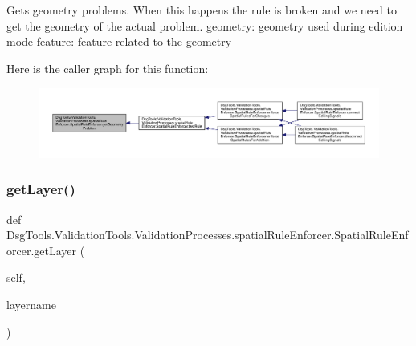 \begin{DoxyVerb}Gets geometry problems.
When this happens the rule is broken and we need to get the geometry of the actual problem.
geometry: geometry used during edition mode
feature: feature related to the geometry
\end{DoxyVerb}
 Here is the caller graph for this function\+:
\nopagebreak
\begin{figure}[H]
\begin{center}
\leavevmode
\includegraphics[width=350pt]{class_dsg_tools_1_1_validation_tools_1_1_validation_processes_1_1spatial_rule_enforcer_1_1_spatial_rule_enforcer_a6a2a7d38c1dba08a2f3f8a8acf3c7da6_icgraph}
\end{center}
\end{figure}
\mbox{\label{class_dsg_tools_1_1_validation_tools_1_1_validation_processes_1_1spatial_rule_enforcer_1_1_spatial_rule_enforcer_afa2ba2a249fc1aa3b5418f6490438b2d}} 
\subsubsection{\texorpdfstring{get\+Layer()}{getLayer()}}
{\footnotesize\ttfamily def Dsg\+Tools.\+Validation\+Tools.\+Validation\+Processes.\+spatial\+Rule\+Enforcer.\+Spatial\+Rule\+Enforcer.\+get\+Layer (\begin{DoxyParamCaption}\item[{}]{self,  }\item[{}]{layername }\end{DoxyParamCaption})}

